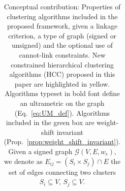 \begin{table}[t]
\begin{subtable}[t!]{\textwidth}
\begin{tabular}{l |c  c  c  c  c}
            
             


             





        \end{tabular}
    \end{subtable} 
    \caption{Conceptual contribution: Properties of clustering algorithms included in the proposed \algname{} framework, given a linkage criterion, a type of graph (signed or unsigned) and the optional use of cannot-link constraints. New constrained hierarchical clustering algorithms (HCC) proposed in this paper are highlighted in yellow. Algorithms typeset in bold font define an ultrametric on the graph (Eq.~\ref{eq:UM_def}). Algorithms included in the green box are weight-shift invariant (Prop.~\ref{prop:weight_shift_invariant}). 
    Given a signed graph $\mathcal{G}(V,E, w_e)$, we denote as $E_{ij}=(S_i \times S_{j}) \cap E$ the set of edges connecting two clusters $S_i \subseteq V$, $S_j \subseteq V$. } 
    \label{tab:linkage-criteria}
\end{table}



